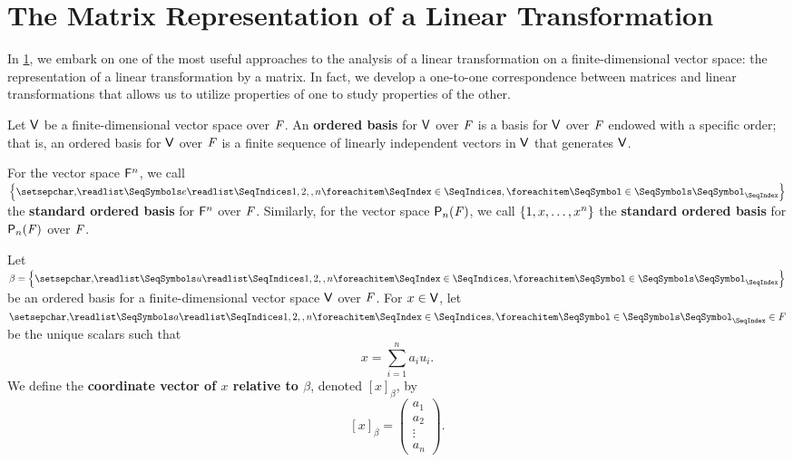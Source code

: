 \section{The Matrix Representation of a Linear Transformation}\label{sec:2.2}

\begin{note}
  In \cref{sec:2.2}, we embark on one of the most useful approaches to the analysis of a linear transformation on a finite-dimensional vector space:
  the representation of a linear transformation by a matrix.
  In fact, we develop a one-to-one correspondence between matrices and linear transformations that allows us to utilize properties of one to study properties of the other.
\end{note}

\begin{defn}\label{2.2.1}
  Let \(\mathsf{V}\) be a finite-dimensional vector space over \(\mathit{F}\).
  An \textbf{ordered basis} for \(\mathsf{V}\) over \(\mathit{F}\) is a basis for \(\mathsf{V}\) over \(\mathit{F}\) endowed with a specific order;
  that is, an ordered basis for \(\mathsf{V}\) over \(\mathit{F}\) is a finite sequence of linearly independent vectors in \(\mathsf{V}\) that generates \(\mathsf{V}\).
\end{defn}

\begin{defn}\label{2.2.2}
  For the vector space \(\mathsf{F}^n\), we call \(\set{\seq{e}{1,2,,n}}\) the \textbf{standard ordered basis} for \(\mathsf{F}^n\) over \(\mathit{F}\).
  Similarly, for the vector space \(\ps[n]{\F}\), we call \(\left\lbrace1, x, \dots, x^n\right\rbrace\) the \textbf{standard ordered basis} for \(\ps[n]{\F}\) over \(\mathit{F}\).
\end{defn}

\begin{defn}\label{2.2.3}
  Let \(\beta = \set{\seq{u}{1,2,,n}}\) be an ordered basis for a finite-dimensional vector space \(\mathsf{V}\) over \(\mathit{F}\).
  For \(x \in \mathsf{V}\), let \(\seq{a}{1,2,,n} \in \F\) be the unique scalars such that
  \[
    x = \sum_{i = 1}^n a_i u_i.
  \]
  We define the \textbf{coordinate vector of \(x\) relative to \(\beta\)}, denoted \([x]_{\beta}\), by
  \[
    [x]_{\beta} = \begin{pmatrix}
      a_1    \\
      a_2    \\
      \vdots \\
      a_n
    \end{pmatrix}.
  \]
\end{defn}

